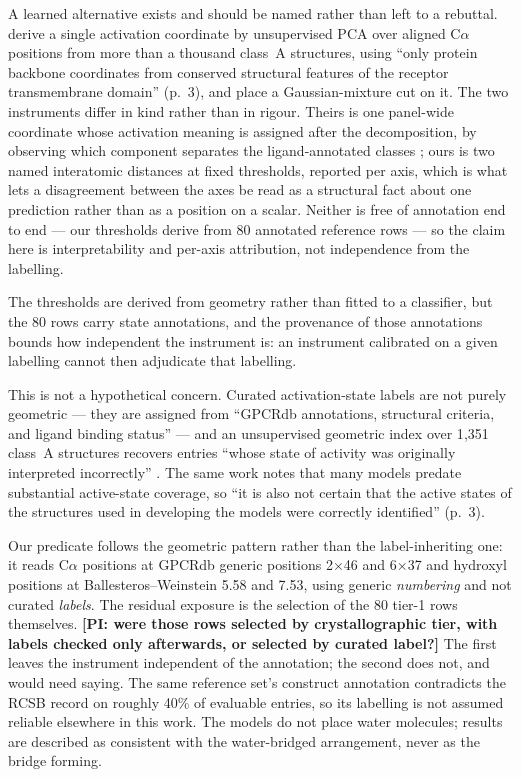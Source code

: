 A learned alternative exists and should be named rather than left to a rebuttal.
\citet{paajanen2026activation} derive a single activation coordinate by
unsupervised PCA over aligned C$\alpha$ positions from more than a thousand
class~A structures, using ``only protein backbone coordinates from conserved
structural features of the receptor transmembrane domain'' (p.~3), and place a
Gaussian-mixture cut on it. The two instruments differ in kind rather than in
rigour. Theirs is one panel-wide coordinate whose activation meaning is assigned
after the decomposition, by observing which component separates the
ligand-annotated classes \citep[p.~10]{paajanen2026activation}; ours is two
named interatomic distances at fixed thresholds, reported per axis, which is
what lets a disagreement between the axes be read as a structural fact about one
prediction rather than as a position on a scalar. Neither is free of annotation
end to end --- our thresholds derive from 80 annotated reference rows --- so the
claim here is interpretability and per-axis attribution, not independence from
the labelling.

The thresholds are derived from geometry rather than fitted to a classifier, but
the 80 rows carry state annotations, and the provenance of those annotations
bounds how independent the instrument is: an instrument calibrated on a given
labelling cannot then adjudicate that labelling.

This is not a hypothetical concern. Curated activation-state labels are not
purely geometric --- they are assigned from ``GPCRdb annotations, structural
criteria, and ligand binding status'' \citep[p.~12]{khaleq2026hyaline} --- and
an unsupervised geometric index over 1{,}351 class~A structures recovers
entries ``whose state of activity was originally interpreted incorrectly''
\citep[p.~3]{paajanen2026activation}. The same work notes that many models
predate substantial active-state coverage, so ``it is also not certain that the
active states of the structures used in developing the models were correctly
identified'' (p.~3).

Our predicate follows the geometric pattern rather than the label-inheriting
one: it reads C$\alpha$ positions at GPCRdb generic positions
2$\times$46 and 6$\times$37 and hydroxyl positions at Ballesteros--Weinstein
5.58 and 7.53, using generic \emph{numbering} and not curated \emph{labels}. The residual exposure is the selection of the 80 tier-1
rows themselves. \textbf{[PI: were those rows selected by crystallographic tier,
with labels checked only afterwards, or selected by curated label?]} The first
leaves the instrument independent of the annotation; the second does not, and
would need saying. The same reference set's construct annotation contradicts the
RCSB record on roughly 40\% of evaluable entries, so its labelling is not
assumed reliable elsewhere in this work.
The models do not place water molecules; results are described as consistent
with the water-bridged arrangement, never as the bridge forming.

